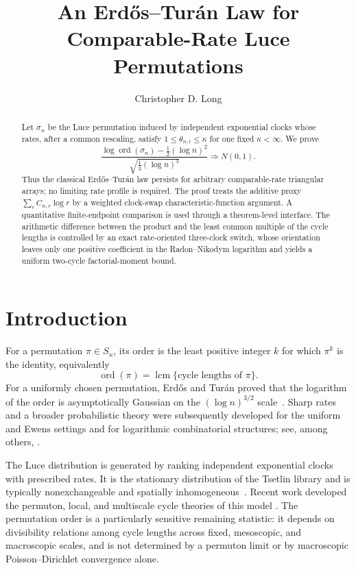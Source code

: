 \documentclass[11pt]{article}
\title{An Erd\H{o}s--Tur\'an Law for Comparable-Rate Luce Permutations}
\author{Christopher D. Long}
\date{}
\theoremstyle{remark}
\newcommand{\ord}{\operatorname{ord}}
\newcommand{\lcm}{\operatorname{lcm}}
\begin{document}
\maketitle

\begin{abstract}
Let $\sigma_n$ be the Luce permutation induced by independent exponential
clocks whose rates, after a common rescaling, satisfy
$1\leq\theta_{n,i}\leq\kappa$ for one fixed $\kappa<\infty$.  We prove
\[
 \frac{\log\ord(\sigma_n)-\frac12(\log n)^2}
 {\sqrt{\frac13(\log n)^3}}
 \Rightarrow N(0,1).
\]
Thus the classical Erd\H{o}s--Tur\'an law persists for arbitrary
comparable-rate triangular arrays; no limiting rate profile is required.
The proof treats the additive proxy $\sum_r C_{n,r}\log r$ by a weighted
clock-swap characteristic-function argument.  A quantitative
finite-endpoint comparison is used through a theorem-level interface.  The
arithmetic difference between the product and the least common multiple of
the cycle lengths is controlled by an exact rate-oriented three-clock
switch, whose orientation leaves only one positive coefficient in the
Radon--Nikodym logarithm and yields a uniform two-cycle factorial-moment
bound.
\end{abstract}

\tableofcontents

\section{Introduction}

For a permutation $\pi\in S_n$, its order is the least positive integer
$k$ for which $\pi^k$ is the identity, equivalently
\[
 \ord(\pi)=\lcm\{\text{cycle lengths of }\pi\}.
\]
For a uniformly chosen permutation, Erd\H{o}s and Tur\'an proved that the
logarithm of the order is asymptotically Gaussian on the
$(\log n)^{3/2}$ scale~\cite{ErdosTuran1967}.  Sharp rates and a broader
probabilistic theory were subsequently developed for the uniform and Ewens
settings and for logarithmic combinatorial structures; see, among others,
\cite{BarbourTavare1994,ABT2003,GnedinIksanovMarynych2012,StormZeindler2015}.

The Luce distribution is generated by ranking independent exponential
clocks with prescribed rates.  It is the stationary distribution of the
Tsetlin library and is typically nonexchangeable and spatially
inhomogeneous~\cite{Luce1959,CDK2024}.  Recent work developed the permuton,
local, and multiscale cycle theories of this model
\cite{BCD2025,LongLuce2026,LongSwitch2026}.  The permutation order is a
particularly sensitive remaining statistic: it depends on divisibility
relations among cycle lengths across fixed, mesoscopic, and macroscopic
scales, and is not determined by a permuton limit or by macroscopic
Poisson--Dirichlet convergence alone.
\end{document}

